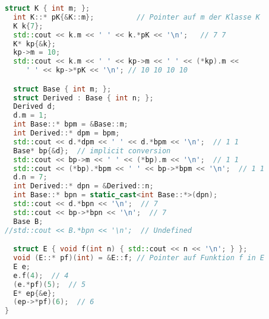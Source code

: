 \documentclass[10pt,twocolumn]{scrartcl}
\begin{document}
\begin{lstlisting}[language=C++]
  struct K { int m; };
  int K::* pK{&K::m};          // Pointer auf m der Klasse K
  K k{7};
  std::cout << k.m << ' ' << k.*pK << '\n';   // 7 7
  K* kp{&k};
  kp->m = 10;
  std::cout << k.m << ' ' << kp->m << ' ' << (*kp).m <<
     ' ' << kp->*pK << '\n'; // 10 10 10 10

  struct Base { int m; };
  struct Derived : Base { int n; };
  Derived d;
  d.m = 1;
  int Base::* bpm = &Base::m;
  int Derived::* dpm = bpm;
  std::cout << d.*dpm << ' ' << d.*bpm << '\n';  // 1 1
  Base* bp{&d};  // implicit conversion
  std::cout << bp->m << ' ' << (*bp).m << '\n';  // 1 1
  std::cout << (*bp).*bpm << ' ' << bp->*bpm << '\n';  // 1 1
  d.n = 7;
  int Derived::* dpn = &Derived::n;
  int Base::* bpn = static_cast<int Base::*>(dpn);
  std::cout << d.*bpn << '\n';  // 7
  std::cout << bp->*bpn << '\n';  // 7
  Base B;
//std::cout << B.*bpn << '\n';  // Undefined

  struct E { void f(int n) { std::cout << n << '\n'; } };
  void (E::* pf)(int) = &E::f; // Pointer auf Funktion f in E
  E e;
  e.f(4);  // 4
  (e.*pf)(5);  // 5
  E* ep{&e};
  (ep->*pf)(6);  // 6
}
\end{lstlisting}










\end{document}
